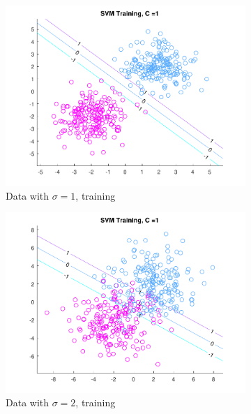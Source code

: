 \begin{figure}[h!]
\centering
    \begin{subfigure}[b]{0.22\textwidth}
	\includegraphics[scale=0.4]{figures/hw2_2_stdev1_a_1.pdf}
	\caption{Data with $\sigma = 1$, training}\label{fig:svm_data_stdev1a}
    \end{subfigure}
    \begin{subfigure}[b]{0.22\textwidth}
	\includegraphics[scale=0.4]{figures/hw2_2_stdev2_a_1.pdf}
	\caption{Data with $\sigma = 2$, training}\label{fig:svm_data_stdev2a}
    \end{subfigure}
    \begin{subfigure}[b]{0.22\textwidth}

\end{subfigure}
\end{figure}
